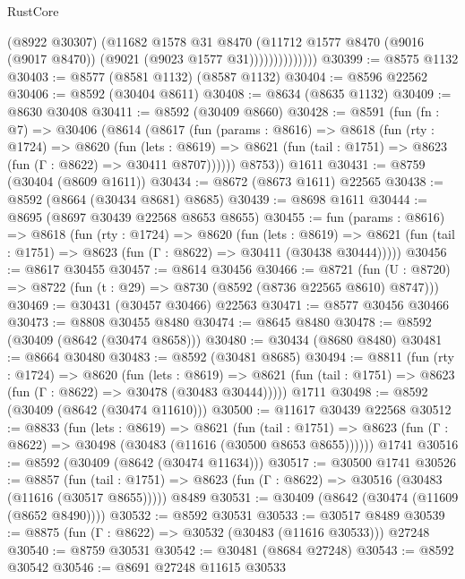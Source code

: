 \begin{lexlean}{RustCore}
\begin{coremodule}
                        (@8922 @30307)
                        (@11682
                          @1578
                          @31
                          @8470
                          (@11712
                            @1577
                            @8470
                            (@9016 (@9017 @8470))
                            (@9021 (@9023 @1577 @31))))))))))))))
@30399 := @8575 @1132
@30403 := @8577 (@8581 @1132) (@8587 @1132)
@30404 := @8596 @22562
@30406 := @8592 (@30404 @8611)
@30408 := @8634 (@8635 @1132)
@30409 := @8630 @30408
@30411 := @8592 (@30409 @8660)
@30428 := @8591
    (fun (fn : @7) =>
    @30406
      (@8614
        (@8617
          (fun (params : @8616) =>
          @8618
            (fun (rty : @1724) =>
            @8620
              (fun (lets : @8619) =>
              @8621 (fun (tail : @1751) => @8623 (fun (Γ : @8622) => @30411 @8707))))))
        @8753))
    @1611
@30431 := @8759 (@30404 (@8609 @1611))
@30434 := @8672 (@8673 @1611) @22565
@30438 := @8592 (@8664 (@30434 @8681) @8685)
@30439 := @8698 @1611
@30444 := @8695 (@8697 @30439 @22568 @8653 @8655)
@30455 := fun (params : @8616) =>
  @8618
    (fun (rty : @1724) =>
    @8620
      (fun (lets : @8619) =>
      @8621 (fun (tail : @1751) => @8623 (fun (Γ : @8622) => @30411 (@30438 @30444)))))
@30456 := @8617 @30455
@30457 := @8614 @30456
@30466 := @8721
    (fun (U : @8720) => @8722 (fun (t : @29) => @8730 (@8592 (@8736 @22565 @8610) @8747)))
@30469 := @30431 (@30457 @30466) @22563
@30471 := @8577 @30456 @30466
@30473 := @8808 @30455 @8480
@30474 := @8645 @8480
@30478 := @8592 (@30409 (@8642 (@30474 @8658)))
@30480 := @30434 (@8680 @8480)
@30481 := @8664 @30480
@30483 := @8592 (@30481 @8685)
@30494 := @8811
    (fun (rty : @1724) =>
    @8620
      (fun (lets : @8619) =>
      @8621 (fun (tail : @1751) => @8623 (fun (Γ : @8622) => @30478 (@30483 @30444)))))
    @1711
@30498 := @8592 (@30409 (@8642 (@30474 @11610)))
@30500 := @11617 @30439 @22568
@30512 := @8833
    (fun (lets : @8619) =>
    @8621
      (fun (tail : @1751) =>
      @8623 (fun (Γ : @8622) => @30498 (@30483 (@11616 (@30500 @8653 @8655))))))
    @1741
@30516 := @8592 (@30409 (@8642 (@30474 @11634)))
@30517 := @30500 @1741
@30526 := @8857
    (fun (tail : @1751) => @8623 (fun (Γ : @8622) => @30516 (@30483 (@11616 (@30517 @8655)))))
    @8489
@30531 := @30409 (@8642 (@30474 (@11609 (@8652 @8490))))
@30532 := @8592 @30531
@30533 := @30517 @8489
@30539 := @8875 (fun (Γ : @8622) => @30532 (@30483 (@11616 @30533))) @27248
@30540 := @8759 @30531
@30542 := @30481 (@8684 @27248)
@30543 := @8592 @30542
@30546 := @8691 @27248 @11615 @30533

\end{coremodule}
\end{lexlean}
